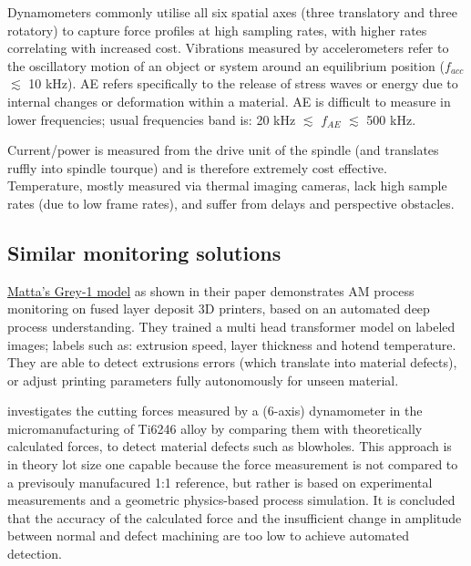 \documentclass[5p,times,procedia]{elsarticle}
\begin{document}
\vspace*{-.5\baselineskip}
Dynamometers commonly utilise all six spatial axes (three translatory and three rotatory) to capture force profiles at high sampling rates, with higher rates correlating with increased cost.
Vibrations measured by accelerometers refer to the oscillatory motion of an object or system around an equilibrium position ($f_{acc}$ $\lesssim$ 10 kHz).
AE refers specifically to the release of stress waves or energy due to internal changes or deformation within a material. AE is difficult to measure in lower frequencies; usual frequencies band is: 20 kHz $\lesssim$ $f_{AE}$ $\lesssim$ 500 kHz. \cite{Jozwik.Mika2015, Sun.Hu.ea2020}

Current/power is measured from the drive unit of the spindle (and translates ruffly into spindle tourque) and is therefore extremely cost effective.
Temperature, mostly measured via thermal imaging cameras, lack high sample rates (due to low frame rates), and suffer from delays and perspective obstacles. 



\subsection{Similar monitoring solutions}
\vspace*{-\baselineskip}


\href{https://www.matta.ai/greymatta}{Matta's Grey-1 model} as shown in their paper \cite{Brion.Pattinson2022} demonstrates AM process monitoring on fused layer deposit 3D printers, based on an automated deep process understanding. 
They trained a multi head transformer model on labeled images; labels such as: extrusion speed, layer thickness and hotend temperature. They are able to detect extrusions errors (which translate into material defects), or adjust printing parameters fully autonomously for unseen material. \cite{Brion.Pattinson2022}


\cite{Pfirrmann.Baumann.ea2021} investigates the cutting forces measured by a (6-axis) dynamometer in the micromanufacturing of Ti6246 alloy by comparing them with theoretically calculated forces, to detect material defects such as blowholes.
This approach is in theory lot size one capable because the force measurement is not compared to a previsouly manufacured 1:1 reference, but rather is based on experimental measurements and a geometric physics-based process simulation. 
It is concluded that the accuracy of the calculated force and the insufficient change in amplitude between normal and defect machining are too low to achieve automated detection. \cite[p.169]{Pfirrmann.Baumann.ea2021} 
\end{document}
